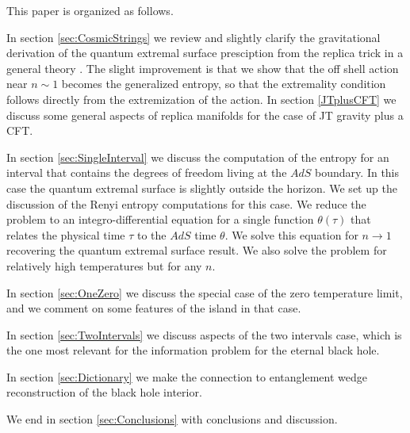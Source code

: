  This paper is organized as follows. 

In section \ref{sec:CosmicStrings} we review and slightly clarify the gravitational derivation of the quantum extremal surface presciption from the replica trick in a general theory \cite{Lewkowycz:2013nqa,Faulkner:2013ana,Dong:2016hjy,Dong:2017xht}. The slight improvement is that we show that the off shell action near $n\sim 1$ becomes the generalized entropy, so that the extremality condition follows directly from the 
extremization of the action. In section 
\ref{JTplusCFT} we discuss some general aspects of replica manifolds for the case of JT gravity plus a CFT. 

In section \ref{sec:SingleInterval} we discuss the computation of the entropy for an interval that contains the degrees of freedom living at the $AdS$ boundary. In this case the quantum extremal surface is slightly outside the horizon. We set up the discussion of the Renyi entropy computations for this case. We reduce the problem to an integro-differential equation for a single function $\theta(\tau)$ that relates the physical time $\tau$ to the $AdS$ time $\theta$. We solve this equation for $n\to 1$ recovering the quantum extremal surface result. We also solve the problem for relatively high temperatures but for any $n$. 

In section \ref{sec:OneZero} we discuss the special case of the zero temperature limit, and we comment on some features of the island in that case. 

In section \ref{sec:TwoIntervals} we discuss aspects of the two intervals case, which is the one most relevant for the information problem for the eternal black hole.  

In section \ref{sec:Dictionary} we make the connection to entanglement wedge reconstruction of the black hole interior.

 We end in section \ref{sec:Conclusions} with conclusions and discussion. 
 

